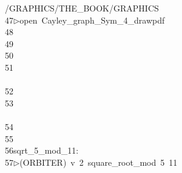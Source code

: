 \begin{tabbing}
\>/GRAPHICS/THE\_BOOK/GRAPHICS\\[0pt]
47\>$\triangleright$\>open\ Cayley\_graph\_Sym\_4\_drawpdf\\[0pt]
48\>\\[0pt]
49\>\\[0pt]
50\>\\[0pt]
51\>\\[0pt]
\>\\[0pt]
52\>\ \\[0pt]
53\>\\[0pt]
\>\\[0pt]
54\>\\[0pt]
55\>\\[0pt]
56\>sqrt\_5\_mod\_11:\\[0pt]
57\>$\triangleright$\>(ORBITER)\ v\ 2\ square\_root\_mod\ 5\ 11\\[0pt]

\end{tabbing}
